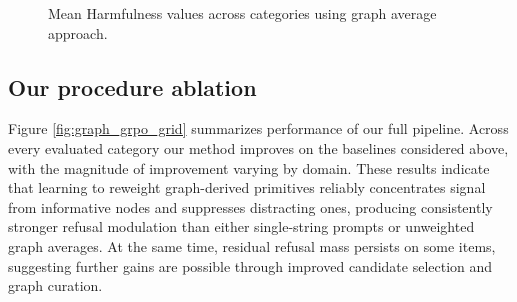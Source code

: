 \documentclass{article}
\theoremstyle{plain}
\theoremstyle{definition}
\theoremstyle{remark}
\begin{document}
\begin{figure}[htbp]
  \caption{Mean Harmfulness values across categories using graph average approach.}
  \label{fig:graph_average_grid}
\end{figure}

\newpage

\subsection{Our procedure ablation} \label{subsec:method_ablation}
Figure \ref{fig:graph_grpo_grid} summarizes performance of our full pipeline. Across every evaluated category our method improves on the baselines considered above, with the magnitude of improvement varying by domain. These results indicate that learning to reweight graph-derived primitives reliably concentrates signal from informative nodes and suppresses distracting ones, producing consistently stronger refusal modulation than either single-string prompts or unweighted graph averages. At the same time, residual refusal mass persists on some items, suggesting further gains are possible through improved candidate selection and graph curation.
\end{document}
